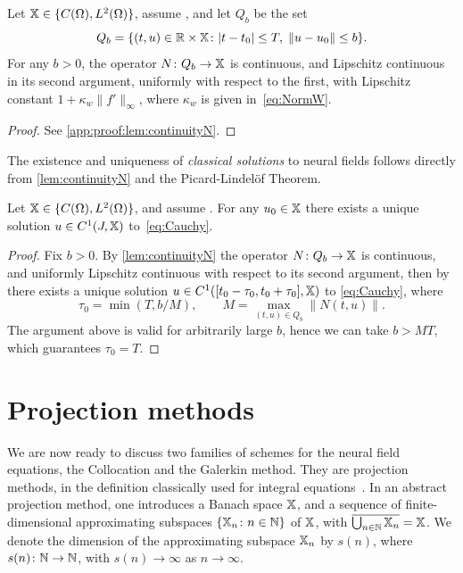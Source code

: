 \documentclass[a4paper,baskervaldx]{daarticle}
\begin{document}
\begin{lemma}\label{lem:continuityN}
  Let $\mathbb{X} \in \{ C(\Omega), L^2(\Omega)\}$, assume
  , and let $Q_b$ be the set 
  \[
    Q_b = 
  \{ (t,u) \in \mathbb{R} \times \mathbb{X} \colon |t - t_0| \leq T, \; \| u -
    u_0 \| \leq b \}.
  \]
  For any $b>0$, the operator $N \colon Q_b \to \mathbb{X}$ is continuous, and Lipschitz
  continuous in its second argument, uniformly with respect to the first, with
  Lipschitz constant $1 + \kappa_w \| f' \|_\infty$, where $\kappa_w$ is given
  in~\cref{eq:NormW}.
\end{lemma}
\begin{proof}
  See \cref{app:proof:lem:continuityN}.
\end{proof}

The existence and uniqueness of \textit{classical solutions} to neural fields follows
directly from \cref{lem:continuityN} and the Picard-Lindel\"of Theorem.

\begin{theorem}\label{thm:existence}
  Let $\mathbb{X} \in \{ C(\Omega), L^2(\Omega)\}$, and assume
  . For any $u_0 \in \mathbb{X}$
  there exists a unique solution $u \in C^1(J,\mathbb{X})$ to~\cref{eq:Cauchy}.
\end{theorem}
\begin{proof}
  Fix $b>0$. By \cref{lem:continuityN} the operator $N \colon Q_b \to
  \mathbb{X}$ is continuous, and uniformly Lipschitz continuous with respect to its
  second argument, then by \cite[Theorem 5.2.4]{atkinson2005theoretical} there exists
  a unique solution $u \in
  C^1([t_0-\tau_0,t_0 + \tau_0],\mathbb{X})$ to \cref{eq:Cauchy}, where
  \[
    \tau_0 = \min(T,b/M), \qquad M = \max_{(t,u) \in Q_b} \| N(t,u) \|.
  \]
  The argument above is valid for arbitrarily large $b$, hence we can take $b > MT$,
  which guarantees $\tau_0 = T$.
\end{proof}

\section{Projection methods}%
\label{sec:projection_methods}
We are now ready to discuss two families of schemes for the neural field equations,
the Collocation and the Galerkin method. They are projection methods, in the
definition classically used for integral
equations~\cite{atkinson1997,atkinson2005theoretical,Chen:2015vv}.
%
In an abstract projection method, one introduces a Banach space $\mathbb{X}$, and a
sequence of finite-dimensional approximating subspaces $\{ \mathbb{X}_n \colon n \in \mathbb{N}\}$ of $\mathbb{X}$, with $\overline{\bigcup_{n \in \mathbb{N}}
\mathbb{X}_n} = \mathbb{X}$. We denote the dimension of the approximating subspace $\mathbb{X}_n$ by
$s(n)$, where $s(n) \colon
\mathbb{N} \to \mathbb{N}$, with $s(n) \to \infty$ as $n\to \infty$.
\end{document}
